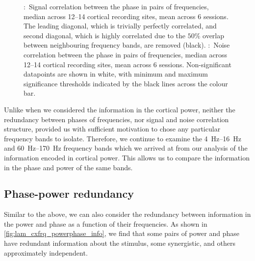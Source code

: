\begin{figure}[htbp]
    \centering
    \hspace*{\fill}
    \hspace*{\fill}\hspace{.2cm}\hspace*{\fill}
    \hspace*{\fill}
    \caption{
\protect{}:~Signal correlation between the phase in pairs of frequencies, median across \numrange{12}{14} cortical recording sites, mean across \num{6} sessions.
The leading diagonal, which is trivially perfectly correlated, and second diagonal, which is highly correlated due to the $50\%$ overlap between neighbouring frequency bands, are removed (black).
\protect{}:~Noise correlation between the phase in pairs of frequencies, median across \numrange{12}{14} cortical recording sites, mean across \num{6} sessions.
Non-significant datapoints are shown in white, with minimum and maximum significance thresholds indicated by the black lines across the colour bar.
}
\label{fig:lam_noisesignal_corr_phase}
\end{figure}


Unlike when we considered the information in the cortical power, neither the redundancy between phases of frequencies, nor signal and noise correlation structure, provided us with sufficient motivation to chose any particular frequency bands to isolate.
Therefore, we continue to examine the \SIrange{4}{16}{Hz} and \SIrange{60}{170}{Hz} frequency bands which we arrived at from our analysis of the information encoded in cortical power.
This allows us to compare the information in the phase and power of the same bands.


\subsection{Phase-power redundancy}

Similar to the above, we can also consider the redundancy between information in the power and phase as a function of their frequencies.
As shown in \autoref{fig:lam_cxfrq_powerphase_info}, we find that some pairs of power and phase have redundant information about the stimulus, some synergistic, and others approximately independent.


